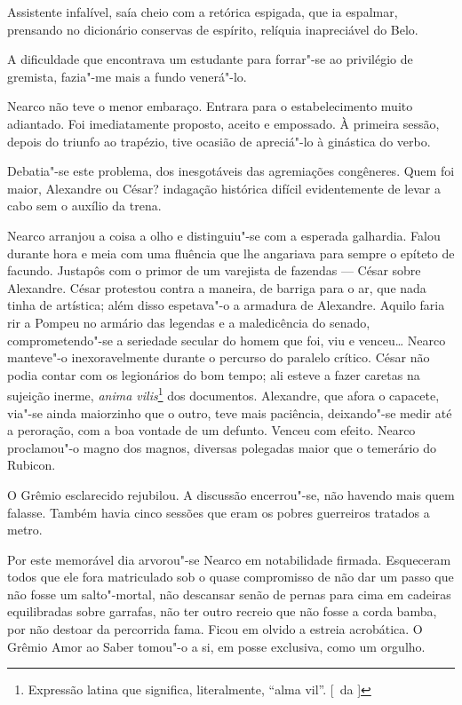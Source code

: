 Assistente infalível, saía cheio com a retórica espigada, que ia
espalmar, prensando no dicionário conservas de espírito, relíquia
inapreciável do Belo. 

A dificuldade que encontrava um estudante para
forrar"-se ao privilégio de gremista, fazia"-me mais a fundo
venerá"-lo. 

Nearco não teve o menor embaraço. Entrara para o
estabelecimento muito adiantado. Foi imediatamente proposto, aceito e
empossado. À primeira sessão, depois do triunfo ao trapézio, tive
ocasião de apreciá"-lo à ginástica do verbo. 

Debatia"-se este
problema, dos inesgotáveis das agremiações congêneres. Quem foi maior,
Alexandre ou César? indagação histórica difícil evidentemente de levar
a cabo sem o auxílio da trena. 

Nearco arranjou a coisa a olho e
distinguiu"-se com a esperada galhardia. Falou durante hora e meia com
uma fluência que lhe angariava para sempre o epíteto de facundo.
Justapôs com o primor de um varejista de fazendas --- César sobre
Alexandre. César protestou contra a maneira, de barriga para o ar, que
nada tinha de artística; além disso espetava"-o a armadura de
Alexandre. Aquilo faria rir a Pompeu no armário das legendas e a
maledicência do senado, comprometendo"-se a seriedade secular do homem
que foi, viu e venceu\ldots{} Nearco manteve"-o inexoravelmente durante o
percurso do paralelo crítico. César não podia contar com os legionários
do bom tempo; ali esteve a fazer caretas na sujeição inerme, \textit{anima
vilis}\footnote{ Expressão latina que significa, literalmente, ``alma vil''. 
[~da ]} dos documentos. 
Alexandre, que afora o capacete, via"-se ainda
maiorzinho que o outro, teve mais paciência, deixando"-se medir até a
peroração, com a boa vontade de um defunto. Venceu com efeito. Nearco
proclamou"-o magno dos magnos, diversas polegadas maior que o
temerário do Rubicon. 

O Grêmio esclarecido rejubilou. A discussão
encerrou"-se, não havendo mais quem falasse. Também havia cinco
sessões que eram os pobres guerreiros tratados a metro. 

Por este memorável dia arvorou"-se Nearco em notabilidade firmada. Esqueceram
todos que ele fora matriculado sob o quase compromisso de não dar um
passo que não fosse um salto"-mortal, não descansar senão de pernas
para cima em cadeiras equilibradas sobre garrafas, não ter outro
recreio que não fosse a corda bamba, por não destoar da percorrida
fama. Ficou em olvido a estreia acrobática. O Grêmio Amor ao Saber
tomou"-o a si, em posse exclusiva, como um orgulho. 

